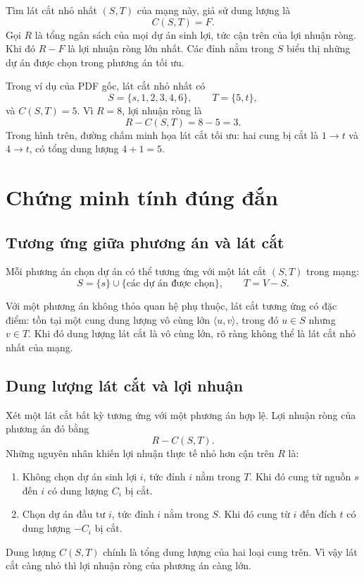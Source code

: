 \documentclass[11pt]{article}
\begin{document}
Tìm lát cắt nhỏ nhất \((S,T)\) của mạng này, giả sử dung lượng là
\[
  C(S,T)=F.
\]
Gọi \(R\) là tổng ngân sách của mọi dự án sinh lợi, tức cận trên của lợi
nhuận ròng. Khi đó \(R-F\) là lợi nhuận ròng lớn nhất. Các đỉnh nằm trong
\(S\) biểu thị những dự án được chọn trong phương án tối ưu.

Trong ví dụ của PDF gốc, lát cắt nhỏ nhất có
\[
  S=\{s,1,2,3,4,6\},\qquad T=\{5,t\},
\]
và \(C(S,T)=5\). Vì \(R=8\), lợi nhuận ròng là
\[
  R-C(S,T)=8-5=3.
\]
Trong hình trên, đường chấm minh họa lát cắt tối ưu: hai cung bị cắt là
\(1\to t\) và \(4\to t\), có tổng dung lượng \(4+1=5\).

\section{Chứng minh tính đúng đắn}

\subsection{Tương ứng giữa phương án và lát cắt}

Mỗi phương án chọn dự án có thể tương ứng với một lát cắt \((S,T)\) trong
mạng:
\[
  S=\{s\}\cup\{\text{các dự án được chọn}\},\qquad T=V-S.
\]

Với một phương án không thỏa quan hệ phụ thuộc, lát cắt tương ứng có đặc điểm:
tồn tại một cung dung lượng vô cùng lớn \(\langle u,v\rangle\), trong đó
\(u\in S\) nhưng \(v\in T\). Khi đó dung lượng lát cắt là vô cùng lớn, rõ ràng
không thể là lát cắt nhỏ nhất của mạng.

\subsection{Dung lượng lát cắt và lợi nhuận}

Xét một lát cắt bất kỳ tương ứng với một phương án hợp lệ. Lợi nhuận ròng của
phương án đó bằng
\[
  R-C(S,T).
\]
Những nguyên nhân khiến lợi nhuận thực tế nhỏ hơn cận trên \(R\) là:
\begin{enumerate}
  \item Không chọn dự án sinh lợi \(i\), tức đỉnh \(i\) nằm trong \(T\). Khi
  đó cung từ nguồn \(s\) đến \(i\) có dung lượng \(C_i\) bị cắt.
  \item Chọn dự án đầu tư \(i\), tức đỉnh \(i\) nằm trong \(S\). Khi đó cung
  từ \(i\) đến đích \(t\) có dung lượng \(-C_i\) bị cắt.
\end{enumerate}

Dung lượng \(C(S,T)\) chính là tổng dung lượng của hai loại cung trên. Vì vậy
lát cắt càng nhỏ thì lợi nhuận ròng của phương án càng lớn.
\end{document}
